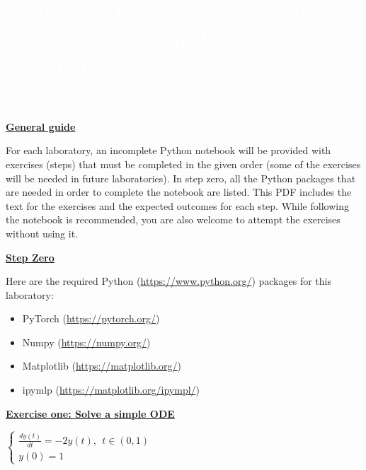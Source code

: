 \documentclass{article}
\title{\textcolor{white}{\textbf{Machine Learning per il Calcolo Scientifico}\\ \small\textbf{Third laboratory exercises }}}
\date{}
\newcommand{\step}[1]{\underline{\textbf{\large{#1}}} }
\begin{document}
    
    \AddToShipoutPicture*
    {%
      \AtPageUpperLeft
        {%
          \color{bluunipv}%
          \raisebox{-.1\paperheight}{\rule{\paperwidth}{.5\paperheight}}%

        }%
    }
    \maketitle
    \begin{center}\step{General guide} \end{center}

    For each laboratory, an incomplete Python notebook will be provided with exercises (steps) that must be completed in the given order (some of the exercises will be needed in future laboratories). In step zero, all the Python packages that are needed in order to complete the notebook are listed. This PDF includes the text for the exercises and the expected outcomes for each step. While following the notebook is recommended, you are also welcome to attempt the exercises without using it.


    \begin{center}\step{Step Zero} \end{center}

    Here are the required Python (\url{https://www.python.org/}) packages for this laboratory:

    \begin{itemize}
      \item PyTorch (\url{https://pytorch.org/})
      \item Numpy (\url{https://numpy.org/})
      \item Matplotlib (\url{https://matplotlib.org/})
      \item[\textcolor{red}{\textbullet}] ipymlp (\url{https://matplotlib.org/ipympl/})
    \end{itemize}


    \begin{center}\step{Exercise one: Solve a simple ODE}\end{center}
    \begin{center}
      $\begin{cases}
          \displaystyle \frac{dy(t)}{dt} = - 2y(t),\ \ t\in (0,1)\\[15pt]
          y(0) = 1 
      \end{cases}$
    \end{center}
\end{document}

